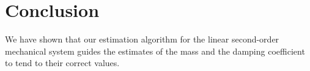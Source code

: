 \section{Conclusion}
\label{sec:conclusion}

We have shown that our estimation algorithm for the linear second-order
mechanical system guides the estimates of the mass and the damping coefficient
to tend to their correct values.
